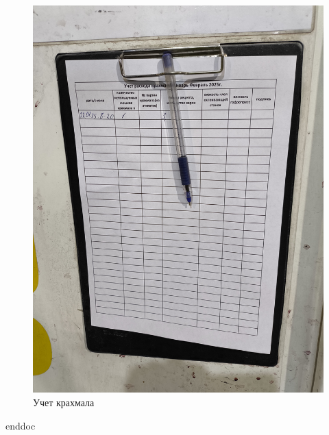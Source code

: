 \begin{figure}
\begin{center}
 \includegraphics[height=0.9\textheight, keepaspectratio]{Pics/V учет расхода крахмала.jpg}
\end{center}
 \caption{Учет крахмала}
 \label{pic:V учет расхода крахмала}
\end{figure}
\clearpage
 {enddoc}

